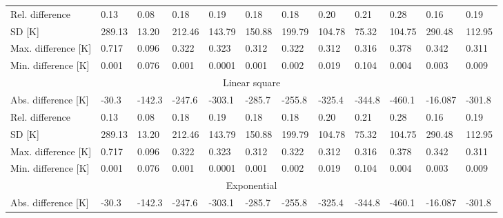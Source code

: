 \begin{table}
\begin{tabular}{llllllllllll}
        Rel. difference         & 0.13                           & 0.08                          & 0.18    & 0.19    & 0.18    & 0.18    & 0.20    & 0.21    & 0.28    & 0.16    & 0.19    \\
        SD {[}K{]}              & 289.13                         & 13.20                         & 212.46  & 143.79  & 150.88  & 199.79  & 104.78  & 75.32   & 104.75  & 290.48  & 112.95  \\
        Max. difference {[}K{]} & 0.717                          & 0.096                         & 0.322   & 0.323   & 0.312   & 0.322   & 0.312   & 0.316   & 0.378   & 0.342   & 0.311   \\
        Min. difference {[}K{]} & 0.001                          & 0.076                         & 0.001   & 0.0001  & 0.001   & 0.002   & 0.019   & 0.104   & 0.004   & 0.003   & 0.009   \\ \hline
        \multicolumn{12}{c}{Linear square}                                                                                                                                                 \\ \hline
        Abs. difference {[}K{]} & -30.3                          & -142.3                        & -247.6  & -303.1  & -285.7  & -255.8  & -325.4  & -344.8  & -460.1  & -16.087 & -301.8  \\
        Rel. difference         & 0.13                           & 0.08                          & 0.18    & 0.19    & 0.18    & 0.18    & 0.20    & 0.21    & 0.28    & 0.16    & 0.19    \\
        SD {[}K{]}              & 289.13                         & 13.20                         & 212.46  & 143.79  & 150.88  & 199.79  & 104.78  & 75.32   & 104.75  & 290.48  & 112.95  \\
        Max. difference {[}K{]} & 0.717                          & 0.096                         & 0.322   & 0.323   & 0.312   & 0.322   & 0.312   & 0.316   & 0.378   & 0.342   & 0.311   \\
        Min. difference {[}K{]} & 0.001                          & 0.076                         & 0.001   & 0.0001  & 0.001   & 0.002   & 0.019   & 0.104   & 0.004   & 0.003   & 0.009   \\ \hline
        \multicolumn{12}{c}{Exponential}                                                                                                                                                   \\ \hline
        Abs. difference {[}K{]} & -30.3                          & -142.3                        & -247.6  & -303.1  & -285.7  & -255.8  & -325.4  & -344.8  & -460.1  & -16.087 & -301.8  \\

\end{tabular}
\end{table}
